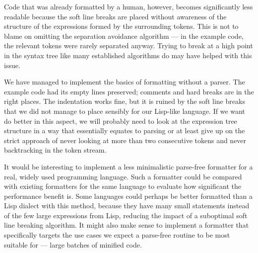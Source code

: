 Code that was already formatted by a human, however,
becomes significantly less readable
because the soft line breaks are placed
without awareness of the structure of the expressions
formed by the surrounding tokens.
This is not to blame on omitting the separation avoidance algorithm ---
in the example code, the relevant tokens were rarely separated anyway.
Trying to break at a high point in the syntax tree
like many established algorithms do
may have helped with this issue.

We have managed to implement the basics of formatting without a parser.
The example code had its empty lines preserved;
comments and hard breaks are in the right places.
The indentation works fine, but it is ruined by
the soft line breaks that we did not manage to place sensibly
for our Lisp-like language.
If we want do better in this aspect,
we will probably need to look at the expression tree structure
in a way that essentially equates to parsing
or at least give up on the strict approach
of never looking at more than two consecutive tokens
and never backtracking in the token stream.

It would be interesting to implement a
less minimalistic parse-free formatter
for a real, widely used programming language.
Such a formatter could be compared with
existing formatters for the same language
to evaluate how significant the performance benefit is.
Some languages could perhaps be
better formatted than a Lisp dialect with this method,
because they have many small statements
instead of the few large expressions from Lisp,
reducing the impact of a suboptimal soft line breaking algorithm.
It might also make sense to implement a formatter
that specifically targets the use cases
we expect a parse-free routine to be most suitable for
--- large batches of minified code.
